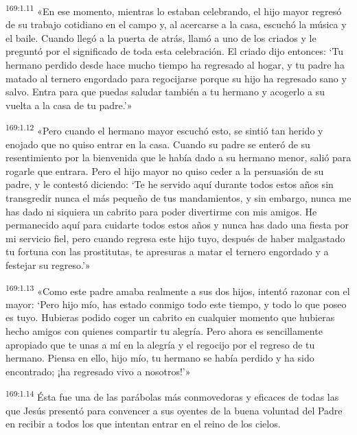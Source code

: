 \par 
\textsuperscript{169:1.11} «En ese momento, mientras lo estaban celebrando, el hijo mayor regresó de su trabajo cotidiano en el campo y, al acercarse a la casa, escuchó la música y el baile. Cuando llegó a la puerta de atrás, llamó a uno de los criados y le preguntó por el significado de toda esta celebración. El criado dijo entonces: `Tu hermano perdido desde hace mucho tiempo ha regresado al hogar, y tu padre ha matado al ternero engordado para regocijarse porque su hijo ha regresado sano y salvo. Entra para que puedas saludar también a tu hermano y acogerlo a su vuelta a la casa de tu padre.'»

\par 
\textsuperscript{169:1.12} «Pero cuando el hermano mayor escuchó esto, se sintió tan herido y enojado que no quiso entrar en la casa. Cuando su padre se enteró de su resentimiento por la bienvenida que le había dado a su hermano menor, salió para rogarle que entrara. Pero el hijo mayor no quiso ceder a la persuasión de su padre, y le contestó diciendo: `Te he servido aquí durante todos estos años sin transgredir nunca el más pequeño de tus mandamientos, y sin embargo, nunca me has dado ni siquiera un cabrito para poder divertirme con mis amigos. He permanecido aquí para cuidarte todos estos años y nunca has dado una fiesta por mi servicio fiel, pero cuando regresa este hijo tuyo, después de haber malgastado tu fortuna con las prostitutas, te apresuras a matar el ternero engordado y a festejar su regreso.'»

\par 
\textsuperscript{169:1.13} «Como este padre amaba realmente a sus dos hijos, intentó razonar con el mayor: `Pero hijo mío, has estado conmigo todo este tiempo, y todo lo que poseo es tuyo. Hubieras podido coger un cabrito en cualquier momento que hubieras hecho amigos con quienes compartir tu alegría. Pero ahora es sencillamente apropiado que te unas a mí en la alegría y el regocijo por el regreso de tu hermano. Piensa en ello, hijo mío, tu hermano se había perdido y ha sido encontrado; ¡ha regresado vivo a nosotros!'»

\par 
\textsuperscript{169:1.14} Ésta fue una de las parábolas más conmovedoras y eficaces de todas las que Jesús presentó para convencer a sus oyentes de la buena voluntad del Padre en recibir a todos los que intentan entrar en el reino de los cielos.

